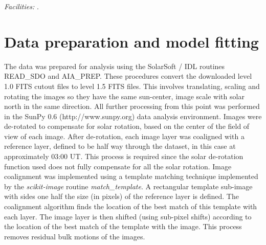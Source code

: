 \documentclass[onecolumn]{emulateapj}
\begin{document}

{\it Facilities:} .



\appendix\section{Data preparation and model fitting}\label{sec:app:data}
The data was prepared for analysis using the SolarSoft / IDL routines
READ\_SDO and AIA\_PREP.  These procedures convert the downloaded
level 1.0 FITS cutout files to level 1.5 FITS files.  This involves
translating, scaling and rotating the images so they have the same
sun-center, image scale with solar north in the same direction.  All
further processing from this point was performed in the SunPy 0.6
(http://www.sunpy.org) data analysis environment.  Images were
de-rotated to compensate for solar rotation, based on the center of
the field of view of each image.  After de-rotation, each image layer
was coaligned with a reference layer, defined to be half way through
the dataset, in this case at approximately 03:00 UT.  This process is
required since the solar de-rotation function used does not fully
compensate for all the solar rotation. Image coalignment was
implemented using a template matching technique \citep{lewis1995fast}
implemented by the {\it scikit-image} \citep{Vanderwalt2014} routine
{\it match\_template}.  A rectangular template sub-image with sides
one half the size (in pixels) of the reference layer is defined.  The
coalignment algorithm finds the location of the best match of this
template with each layer.  The image layer is then shifted (using
sub-pixel shifts) according to the location of the best match of the
template with the image.  This process removes residual bulk motions
of the images.
\end{document}
